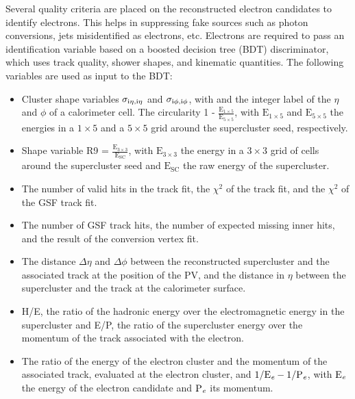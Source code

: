 Several quality criteria are placed on the reconstructed electron candidates to identify electrons. This helps in suppressing fake sources such as photon conversions, jets misidentified as electrons, etc. Electrons are required to pass an identification variable based on a boosted decision tree (BDT) discriminator, which uses track quality, shower shapes, and kinematic quantities. The following variables are used as input to the BDT:
\begin{itemize}
  \item Cluster shape variables $\sigma_{\text{i}\eta, \text{i}\eta}$ and $\sigma_{\text{i}\phi, \text{i}\phi}$, with \ieta and \iphi the integer label of the $\eta$ and $\phi$ of a calorimeter cell. The circularity 1 - $\frac{\text{E}_{1 \times 5}}{\text{E}_{5 \times 5}}$, with $\text{E}_{1 \times 5}$ and $\text{E}_{5 \times 5}$ the energies in a $1 \times 5$ and a $5 \times 5$ grid around the supercluster seed, respectively.
  \item Shape variable R9 = $\frac{\text{E}_{3 \times 3}}{\text{E}_{\text{SC}}}$, with $\text{E}_{3 \times 3}$ the energy in a $3 \times 3$ grid of cells around the supercluster seed and $\text{E}_{\text{SC}}$ the raw energy of the supercluster.
  \item The number of valid hits in the track fit, the $\chi^{2}$ of the track fit, and the $\chi^{2}$ of the GSF track fit.
  \item The number of GSF track hits, the number of expected missing inner hits, and the result of the conversion vertex fit.
  \item The distance $\Delta \eta$ and $\Delta \phi$ between the reconstructed supercluster and the associated track at the position of the PV, and the distance in $\eta$ between the supercluster and the track at the calorimeter surface.
  \item H/E, the ratio of the hadronic energy over the electromagnetic energy in the supercluster and E/P, the ratio of the supercluster energy over the momentum of the track associated with the electron.
  \item The ratio of the energy of the electron cluster and the momentum of the associated track, evaluated at the electron cluster, and $1/\text{E}_{\textit{e}} - 1/\text{P}_{\textit{e}}$, with $\text{E}_{\textit{e}}$ the energy of the electron candidate and $\text{P}_{\textit{e}}$ its momentum.
\end{itemize}

